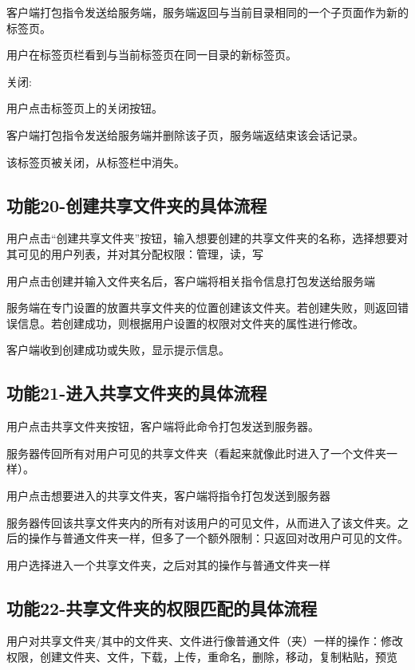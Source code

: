 客户端打包指令发送给服务端，服务端返回与当前目录相同的一个子页面作为新的标签页。

用户在标签页栏看到与当前标签页在同一目录的新标签页。

关闭:

用户点击标签页上的关闭按钮。 

客户端打包指令发送给服务端并删除该子页，服务端返结束该会话记录。

该标签页被关闭，从标签栏中消失。 

\subsection{功能20-创建共享文件夹的具体流程}

用户点击“创建共享文件夹”按钮，输入想要创建的共享文件夹的名称，选择想要对其可见的用户列表，并对其分配权限：管理，读，写

用户点击创建并输入文件夹名后，客户端将相关指令信息打包发送给服务端

服务端在专门设置的放置共享文件夹的位置创建该文件夹。若创建失败，则返回错误信息。若创建成功，则根据用户设置的权限对文件夹的属性进行修改。

客户端收到创建成功或失败，显示提示信息。

\subsection{功能21-进入共享文件夹的具体流程}

用户点击共享文件夹按钮，客户端将此命令打包发送到服务器。
                                                                             
服务器传回所有对用户可见的共享文件夹（看起来就像此时进入了一个文件夹一样）。

用户点击想要进入的共享文件夹，客户端将指令打包发送到服务器

服务器传回该共享文件夹内的所有对该用户的可见文件，从而进入了该文件夹。之后的操作与普通文件夹一样，但多了一个额外限制：只返回对改用户可见的文件。

用户选择进入一个共享文件夹，之后对其的操作与普通文件夹一样

\subsection{功能22-共享文件夹的权限匹配的具体流程}

用户对共享文件夹/其中的文件夹、文件进行像普通文件（夹）一样的操作：修改权限，创建文件夹、文件，下载，上传，重命名，删除，移动，复制粘贴，预览

